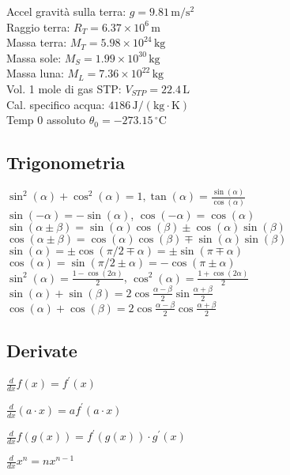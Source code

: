 \documentclass[10pt]{article}
\begin{document}
\begin{multicols}{3}
Accel gravit\`a sulla terra: $g = 9.81\,\mathrm{m/s^2}$\\
Raggio terra:  $R_T = 6.37\times 10^{6}\,\mathrm{m}$\\
Massa terra:  $M_T = 5.98\times 10^{24}\,\mathrm{kg}$\\
Massa sole:  $M_S = 1.99 \times 10^{30}\,\mathrm{kg}$\\
Massa luna:  $M_L = 7.36 \times 10^{22}\,\mathrm{kg}$\\
Vol. 1 mole di gas STP: $V_{STP} = 22.4 \,\mathrm{L}$\\
Cal. specifico acqua: $4186 \,\mathrm{J/(kg \cdot K)}$\\
Temp 0 assoluto $\theta_0 = -273.15\,\mathrm{^\circ C}$

\subsection*{Trigonometria}

$\sin^2(\alpha)+\cos^2(\alpha) = 1, \tan(\alpha)=\frac{\sin(\alpha)}{\cos(\alpha)}$ \\
$\sin(-\alpha) = -\sin(\alpha)$, $\cos(-\alpha) = \cos(\alpha)$\\
$\sin(\alpha \pm \beta) = \sin(\alpha)\cos(\beta) \pm
\cos(\alpha)\sin(\beta)$\\
$\cos(\alpha \pm \beta) = \cos(\alpha)\cos(\beta) \mp
\sin(\alpha)\sin(\beta)$ \\
$\sin(\alpha) = \pm\cos(\pi/2\mp\alpha) = \pm\sin(\pi\mp\alpha) $\\
$\cos(\alpha) = \sin(\pi/2\pm\alpha) = -\cos(\pi\pm\alpha)$\\
$\sin^2(\alpha) = \frac{1-\cos(2\alpha)}{2}$,
$\cos^2(\alpha) = \frac{1+\cos(2\alpha)}{2}$\\
$\sin(\alpha) + \sin(\beta) = 2 \cos\frac{\alpha-\beta}{2} \sin\frac{\alpha+\beta}{2} $\\
$\cos(\alpha) + \cos(\beta) = 2 \cos\frac{\alpha-\beta}{2} \cos\frac{\alpha+\beta}{2} $

\subsection*{Derivate}

$ \frac {d} {dx} f(x)= f^\prime(x) $

$\frac {d} {dx}(a\cdot x) = a f^\prime(a\cdot x)$

$ \frac {d} {dx} f(g(x)) = f^\prime(g(x)) \cdot g^\prime(x)  $

$\frac d {dx} x^n = n x^{n-1}$


\end{multicols}
\end{document}
